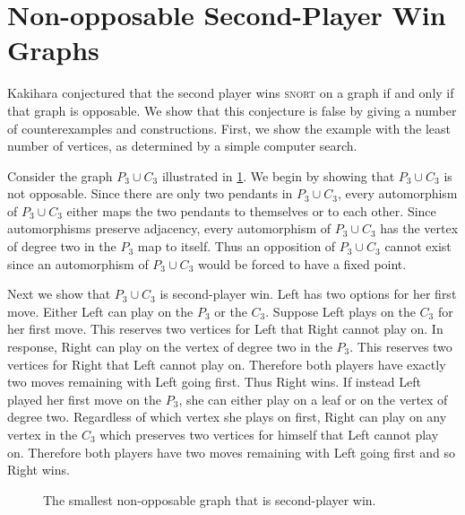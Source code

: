 \documentclass[11pt]{article}
\theoremstyle{definition}
\begin{document}
\section{Non-opposable Second-Player Win Graphs}
\label{sec: non-opposable 2nd player win graphs}

Kakihara \cite{kakihara:snort} conjectured that the second player wins
\textsc{snort} on a graph if and only if that graph is opposable. We show that
this conjecture is false by giving a number of counterexamples and
constructions. First, we show the example with the least number of vertices, as
determined by a simple computer search.

Consider the graph $P_3 \cup C_3$ illustrated in \cref{fig: P3 U C3}. We begin
by showing that $P_3 \cup C_3$ is not opposable. Since there are only two
pendants in $P_3 \cup C_3$, every automorphism of $P_3 \cup C_3$ either maps
the two pendants to themselves or to each other. Since automorphisms preserve
adjacency, every automorphism of $P_3 \cup C_3$ has the vertex of degree two in
the $P_3$ map to itself. Thus an opposition of $P_3 \cup C_3$ cannot exist
since an automorphism of $P_3 \cup C_3$ would be forced to have a fixed point.

Next we show that $P_3 \cup C_3$ is second-player win. Left has two options for
her first move. Either Left can play on the $P_3$ or the $C_3$. Suppose Left
plays on the $C_3$ for her first move. This reserves two vertices for Left that
Right cannot play on. In response, Right can play on the vertex of degree two
in the $P_3$. This reserves two vertices for Right that Left cannot play on.
Therefore both players have exactly two moves remaining with Left going first.
Thus Right wins. If instead Left played her first move on the $P_3$, she can
either play on a leaf or on the vertex of degree two. Regardless of which
vertex she plays on first, Right can play on any vertex in the $C_3$ which
preserves two vertices for himself that Left cannot play on. Therefore both
players have two moves remaining with Left going first and so Right wins.

\begin{figure}
    \centering
    \caption{The smallest non-opposable graph that is second-player win.}
    \label{fig: P3 U C3}
\end{figure}
\end{document}
